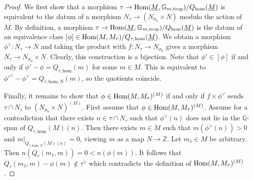 \documentclass[11pt]{amsart}
\theoremstyle{definition}
\theoremstyle{remark}
\def\hom{\mathrm{hom}}
\def\trop{\mathrm{trop}}
\DeclareMathOperator{\Hom}{\textup{Hom}}
\begin{document}
\begin{proof}
	We first show that a morphism $\tau\to \Hom(\underline{M},\mathbb{G}_{m,\trop})/Q_{\hom}(\underline{M})$ is equivalent to the
	datum of a morphism $N_{\tau}\to (N_{\sigma_0}\times N)$ modulo the action of $M$. By definition, a morphism
	$\tau\to \Hom(\underline{M},\mathbb{G}_{m,\trop})/Q_{\hom}(\underline{M})$ is the datum of an equivalence class
	$[\phi]\in \Hom(M,M_{\tau})/Q_{\tau,\hom}(\underline{M})$. We obtain a morphism $\phi^{\vee}:N_{\tau}\to N$ and taking
	the product with $f:N_{\tau}\to N_{\sigma_0}$ gives a morphism $N_{\tau}\to N_{\sigma_0}\times N$. Clearly, this construction
	is a bijection. Note that $\phi'\in [\phi]$ if and only if
	$\phi'-\phi=Q_{\tau,\hom}(m)$ for some $m\in M$. This is equivalent to ${\phi'}^{\vee}-\phi^{\vee}=Q_{\tau,\hom,N}(m)$,
	so the quotients coincide.

	Finally, it remains to show that $\phi\in \Hom(M,M_{\tau})^{(M)}$ if and only if $f\times\phi^{\vee}$ sends $\tau\cap N_{\tau}$
	to $(N_{\sigma_0}\times N)^{(M)}$. First assume that $\phi\in \Hom(M,M_{\tau})^{(M)}$. Assume for a contradiction
	that there exists $n\in \tau\cap N_{\tau}$
	such that $\phi^{\vee}(n)$ does not lie in the $\mathbb{Q}$-span of $Q_{\tau,\hom}(M)(n)$. Then there exists $m\in M$ such that
	$m(\phi^{\vee}(n))>0$ and $m|_{Q_{\tau,\hom,N}(M)(n)}=0$, viewing $m$ as a map $N\to \mathbb{Z}$.
	Let $m_1\in M$ be arbitrary. Then $n(Q_{\tau}(m_1,m))=0<n(\phi(m))$. It follows
	that $Q_{\tau}(m_1,m)-\phi(m)\notin \tau^{\vee}$ which contradicts the definition of $\Hom(M,M_{\tau})^{(M)}$.


\end{proof}
\end{document}
